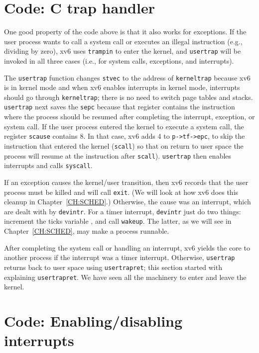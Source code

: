 \section{Code: C trap handler}

One good property of the code above is that it also works for
exceptions.  If the user process wants to call a system call or
executes an illegal instruction (e.g., dividing by zero), xv6 uses
\lstinline{trampin} to enter the kernel, and \lstinline{usertrap} will
be invoked in all three cases (i.e., for system calls, exceptions, and
interrupts).

The \lstinline{usertrap} function changes \lstinline{stvec} to the
address of \lstinline{kerneltrap} because xv6 is in kernel mode and
when xv6 enables interrupts in kernel mode, interrupts should go
through \lstinline{kerneltrap}; there is no need to switch page tables
and stacks. \lstinline{usertrap} next saves the \lstinline{sepc}
because that register contains the instruction where the process
should be resumed after completing the interrupt, exception, or system
call.  If the user process entered the kernel to execute a system
call, the register \lstinline{scause} contains 8.  In that case, xv6
adds 4 to \lstinline{p->tf->epc}, to skip the instruction that entered
the kernel (\lstinline{scall}) so that on return to user space the
process will resume at the instruction after \lstinline{scall}).
\lstinline{usertrap} then enables interrupts and calls
\lstinline{syscall}.

If an exception causes the kernel/user transition, then xv6 records
that the user process must be killed and will call \lstinline{exit}.
(We will look at how xv6 does this cleanup in Chapter~\ref{CH:SCHED}.)
Otherwise, the cause was an interrupt, which are dealt with by
\lstinline{devintr}.  For a timer
interrupt, \lstinline{devintr} just do two things: increment the ticks
variable , and call
\lstinline{wakeup}.  The latter, as
we will see in Chapter~\ref{CH:SCHED}, may make a process runnable.

After completing the system call or handling an interrupt, xv6 yields
the core to another process if the interrupt was a timer interrupt.
Otherwise, \lstinline{usertrap} returns back to user space using
\lstinline{usertrapret}; this section started with explaining
\lstinline{usertrapret}.  We have seen all the machinery to enter and
leave the kernel.
 
\section{Code: Enabling/disabling interrupts}

